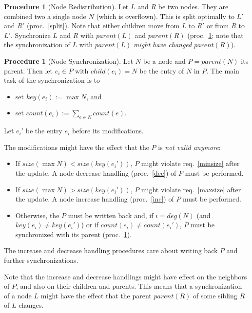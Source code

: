 \documentclass[a4paper, 8pt]{scrartcl}
\theoremstyle{plain}
\theoremstyle{definition}
\newtheorem{proc}[thm]{Procedure}
\theoremstyle{remark}
\begin{document}
\begin{multicols}{2}
\begin{proc}[Node Redistribution] \label{dist}
Let $L$ and $R$ be two nodes. They are combined two a single node $N$
(which is overflown).
This is split optimally to $L'$ and $R'$ (proc.~\ref{split}).
Note that either children move from $L$ to $R'$ or from $R$ to $L'$.
Synchronize $L$ and $R$ with $parent(L)$ and $parent(R)$ (proc.~\ref{sync};
note that the synchronization of $L$ with $parent(L)$ {\em might have changed}
$parent(R)$).
\end{proc}


\begin{proc}[Node Synchronization] \label{sync}
Let $N$ be a node and $P = parent(N)$ its parent.
Then let \mbox{$e_i \in P$} with \mbox{$child(e_i) = N$} be the entry of
$N$ in $P$.
The main task of the synchronization is to
\begin{itemize}
\item set \mbox{$key(e_i) := \max N$}, and
\item set \mbox{$count(e_i) := \sum_{e \in N} count(e)$}.
\end{itemize}
Let $e_i'$ be the entry $e_i$ before its modifications.

The modifications might have the effect that the $P$ is {\em not valid anymore}:
\begin{itemize}
\item If \mbox{$size(\max N) < size(key(e_i'))$},
	$P$ might violate req.~\ref{minsize} after the update.
	A node decrease handling (proc.~\ref{dec}) of $P$ must be performed.
\item If \mbox{$size(\max N) > size(key(e_i'))$},
	$P$ might violate req.~\ref{maxsize} after the update.
	A node increase handling (proc.~\ref{inc}) of $P$ must be performed.
\item Otherwise, the $P$ must be written back and, if $i = deg(N)$ (and
	$key(e_i) \neq key(e_i')$) or if $count(e_i) \neq count(e_i')$, $P$
	must be synchronized with its parent (proc.~\ref{sync}).
\end{itemize}

The increase and decrease handling procedures care about writing back $P$
and further synchronizations.

Note that the increase and decrease handlings might have effect on the
neighbors of $P$, and also on their children and parents.
This means that a synchronization of a node $L$ might have the effect that
the parent $parent(R)$ of some sibling $R$ of $L$ changes.
\end{proc}




\end{multicols}
\end{document}
